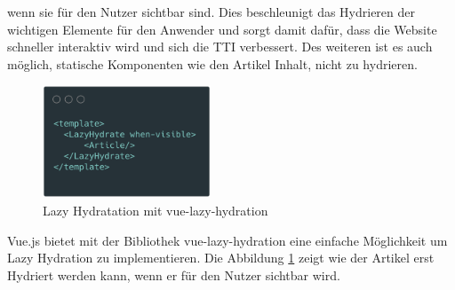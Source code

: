 \documentclass[runningheads]{llncs}
\begin{document}
wenn sie für den Nutzer sichtbar sind. 
Dies beschleunigt das Hydrieren der wichtigen Elemente für den Anwender und sorgt damit dafür, 
dass die Website schneller interaktiv wird und sich die TTI verbessert. 
Des weiteren ist es auch möglich, 
statische Komponenten wie den Artikel Inhalt, nicht zu hydrieren.
\begin{figure}[h]
  \centering
  \includegraphics[width=5cm]{images/LazyHydration}
  \caption{Lazy Hydratation mit vue-lazy-hydration}
  \label{Lazy Hydratation mit vue-lazy-hydration}
\end{figure}
Vue.js bietet mit der Bibliothek vue-lazy-hydration 
eine einfache Möglichkeit um Lazy Hydration zu implementieren. 
Die Abbildung \ref{Lazy Hydratation mit vue-lazy-hydration} zeigt wie der Artikel erst Hydriert werden kann, 
wenn er für den Nutzer sichtbar wird.
\end{document}
